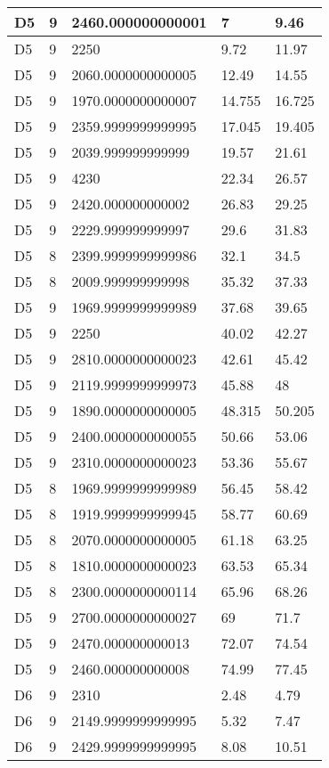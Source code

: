 \begin{longtable}{|l|l|l|l|l|}
D5 & 9 & 2460.000000000001 & 7 & 9.46 \\ \hline
D5 & 9 & 2250 & 9.72 & 11.97 \\ \hline
D5 & 9 & 2060.0000000000005 & 12.49 & 14.55 \\ \hline
D5 & 9 & 1970.0000000000007 & 14.755 & 16.725 \\ \hline
D5 & 9 & 2359.9999999999995 & 17.045 & 19.405 \\ \hline
D5 & 9 & 2039.999999999999 & 19.57 & 21.61 \\ \hline
D5 & 9 & 4230 & 22.34 & 26.57 \\ \hline
D5 & 9 & 2420.000000000002 & 26.83 & 29.25 \\ \hline
D5 & 9 & 2229.999999999997 & 29.6 & 31.83 \\ \hline
D5 & 8 & 2399.9999999999986 & 32.1 & 34.5 \\ \hline
D5 & 8 & 2009.999999999998 & 35.32 & 37.33 \\ \hline
D5 & 9 & 1969.9999999999989 & 37.68 & 39.65 \\ \hline
D5 & 9 & 2250 & 40.02 & 42.27 \\ \hline
D5 & 9 & 2810.0000000000023 & 42.61 & 45.42 \\ \hline
D5 & 9 & 2119.9999999999973 & 45.88 & 48 \\ \hline
D5 & 9 & 1890.0000000000005 & 48.315 & 50.205 \\ \hline
D5 & 9 & 2400.0000000000055 & 50.66 & 53.06 \\ \hline
D5 & 9 & 2310.0000000000023 & 53.36 & 55.67 \\ \hline
D5 & 8 & 1969.9999999999989 & 56.45 & 58.42 \\ \hline
D5 & 8 & 1919.9999999999945 & 58.77 & 60.69 \\ \hline
D5 & 8 & 2070.0000000000005 & 61.18 & 63.25 \\ \hline
D5 & 8 & 1810.0000000000023 & 63.53 & 65.34 \\ \hline
D5 & 8 & 2300.0000000000114 & 65.96 & 68.26 \\ \hline
D5 & 9 & 2700.0000000000027 & 69 & 71.7 \\ \hline
D5 & 9 & 2470.000000000013 & 72.07 & 74.54 \\ \hline
D5 & 9 & 2460.000000000008 & 74.99 & 77.45 \\ \hline
D6 & 9 & 2310 & 2.48 & 4.79 \\ \hline
D6 & 9 & 2149.9999999999995 & 5.32 & 7.47 \\ \hline
D6 & 9 & 2429.9999999999995 & 8.08 & 10.51 \\ \hline

\end{longtable}
